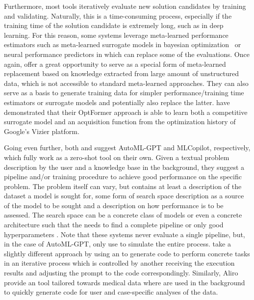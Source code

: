 Furthermore, most \AutoML tools iteratively evaluate new solution candidates by training and validating. Naturally, this is a time-consuming process, especially if the training time of the solution candidate is extremely long, such as in deep learning. For this reason, some systems leverage meta-learned performance estimators such as meta-learned surrogate models in bayesian optimization~\cite{vanschoren-automlbook19a} or neural performance predictors in \NAS \cite{white-neurips21a} which can replace some of the evaluations. Once again, \LLMs offer a great opportunity to serve as a special form of meta-learned replacement based on knowledge extracted from large amount of unstructured data, which is not accessible to standard meta-learned approaches. They can also serve as a basis to generate training data for simpler performance/training time estimators or surrogate models and potentially also replace the latter. \citet{chen-neurips22a} have demonstrated that their OptFormer approach is able to learn both a competitive surrogate model and an acquisition function from the optimization history of Google's Vizier \cite{song-icml22b} platform.

Going even further, both \citet{zhang-arxiv23b} and \citet{zhang-arxiv23a} suggest AutoML-GPT and MLCopilot, respectively, which fully work as a zero-shot \AutoML tool on their own. Given a textual problem description by the user and a knowledge base in the background, they suggest a pipeline and/or training procedure to achieve good performance on the specific problem. The problem itself can vary, but contains at least a description of the dataset a model is sought for, some form of search space description as a source of the model to be sought and a description on how performance is to be assessed. The search space can be a concrete class of models or even a concrete architecture such that the \LLM needs to find a complete pipeline or only good hyperparameters \cite{zhang-arxiv23b}. Note that these systems never evaluate a single \ML pipeline, but, in the case of AutoML-GPT, only use \LLMs to simulate the entire \AutoML process. \citet{tsai-arxiv23a} take a slightly different approach by using an \LLM to generate code to perform concrete \AutoML tasks in an iterative process which is controlled by another \LLM receiving the execution results and adjusting the prompt to the code \LLM correspondingly. Similarly, Aliro \cite{choi-bioinformatics23a} provide an \AutoML tool tailored towards medical data where \LLMs are used in the background to quickly generate code for user and case-specific analyses of the data.


